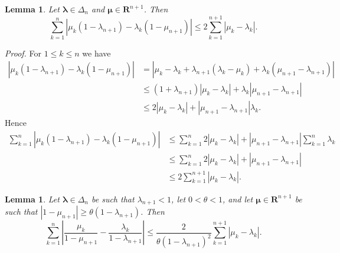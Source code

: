 \documentclass[11pt]{article}%
\newtheorem{lemma}[theorem]{Lemma}
\newenvironment{proof}[1][Proof]{\noindent\textit{#1.} }{}
\begin{document}
\begin{lemma}
\label{aug1}Let $\mathbf{\lambda}\in\Delta_{n}$ and $\mathbf{\mu}\in
\mathbf{R}^{n+1}$. Then%
\[
\sum_{k=1}^{n}\left\vert \mu_{k}(1-\lambda_{n+1})-\lambda_{k}(1-\mu
_{n+1})\right\vert \leq2\sum_{k=1}^{n+1}\left\vert \mu_{k}-\lambda
_{k}\right\vert .
\]

\end{lemma}

\begin{proof}
For $1\leq k\leq n$ we have%
\begin{align*}
\left\vert \mu_{k}(1-\lambda_{n+1})-\lambda_{k}(1-\mu_{n+1})\right\vert  &
=\left\vert \mu_{k}-\lambda_{k}+\lambda_{n+1}(\lambda_{k}-\mu_{k})+\lambda
_{k}(\mu_{n+1}-\lambda_{n+1})\right\vert \\
&  \leq(1+\lambda_{n+1})\left\vert \mu_{k}-\lambda_{k}\right\vert +\lambda
_{k}\left\vert \mu_{n+1}-\lambda_{n+1}\right\vert \\
&  \leq2\left\vert \mu_{k}-\lambda_{k}\right\vert +\left\vert \mu
_{n+1}-\lambda_{n+1}\right\vert \lambda_{k}.
\end{align*}
Hence%
\begin{align}
\sum_{k=1}^{n}\left\vert \mu_{k}(1-\lambda_{n+1})-\lambda_{k}(1-\mu
_{n+1})\right\vert  &  \leq\sum_{k=1}^{n}2\left\vert \mu_{k}-\lambda
_{k}\right\vert +\left\vert \mu_{n+1}-\lambda_{n+1}\right\vert \sum_{k=1}%
^{n}\lambda_{k}\nonumber\\
&  \leq\sum_{k=1}^{n}2\left\vert \mu_{k}-\lambda_{k}\right\vert +\left\vert
\mu_{n+1}-\lambda_{n+1}\right\vert \nonumber\\
&  \leq2\sum_{k=1}^{n+1}\left\vert \mu_{k}-\lambda_{k}\right\vert .
\tag*{$\square$}%
\end{align}

\end{proof}

\begin{lemma}
\label{aug2A}Let $\mathbf{\lambda}\in\Delta_{n}$ be such that $\lambda
_{n+1}<1$, let $0<\theta<1$, and let $\mathbf{\mu}\in\mathbf{R}^{n+1}$ be such
that $\left\vert 1-\mu_{n+1}\right\vert \geq\theta\left(  1-\lambda
_{n+1}\right)  $. Then%
\[
\sum_{k=1}^{n}\left\vert \frac{\mu_{k}}{1-\mu_{n+1}}-\frac{\lambda_{k}%
}{1-\lambda_{n+1}}\right\vert \leq\frac{2}{\theta\left(  1-\lambda
_{n+1}\right)  ^{2}}\sum_{k=1}^{n+1}\left\vert \mu_{k}-\lambda_{k}\right\vert
.
\]

\end{lemma}
\end{document}

